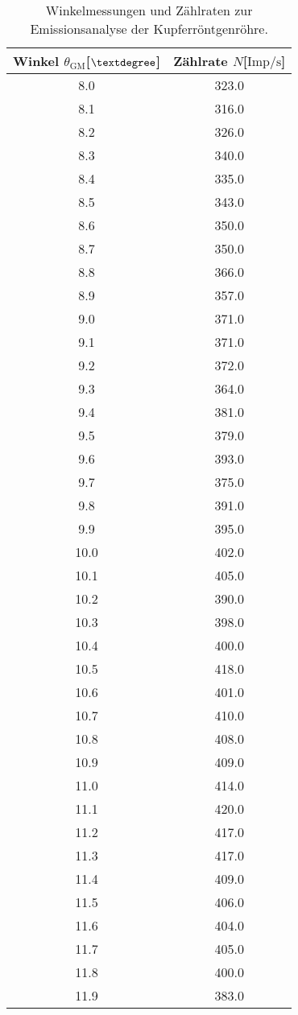 \begin{table}\tiny
\caption{Winkelmessungen und Zählraten zur Emissionsanalyse der Kupferröntgenröhre.}
\begin{minipage}{0.5\textwidth}
\centering
\label{tab:ogemessdaten2}
\begin{tabular}{c c}
    \toprule
    Winkel $\theta_{\text{GM}}$[$\textdegree$] & Zählrate $N$[$\si{{\text{Imp}}\per\second}$]\\
    \midrule
8.0	&	323.0\\
8.1	&	316.0\\
8.2	&	326.0\\
8.3	&	340.0\\
8.4	&	335.0\\
8.5	&	343.0\\
8.6	&	350.0\\
8.7	&	350.0\\
8.8	&	366.0\\
8.9	&	357.0\\
9.0	&	371.0\\
9.1	&	371.0\\
9.2	&	372.0\\
9.3	&	364.0\\
9.4	&	381.0\\
9.5	&	379.0\\
9.6	&	393.0\\
9.7	&	375.0\\
9.8	&	391.0\\
9.9	&	395.0\\
10.0&	402.0\\
10.1&	405.0\\
10.2&	390.0\\
10.3&	398.0\\
10.4&	400.0\\
10.5&	418.0\\
10.6&	401.0\\
10.7&	410.0\\
10.8&	408.0\\
10.9&	409.0\\
11.0&	414.0\\
11.1&	420.0\\
11.2&	417.0\\
11.3&	417.0\\
11.4&	409.0\\
11.5&	406.0\\
11.6&	404.0\\
11.7&	405.0\\
11.8&	400.0\\
11.9&	383.0\\

\end{tabular}
\end{minipage}
\end{table}
